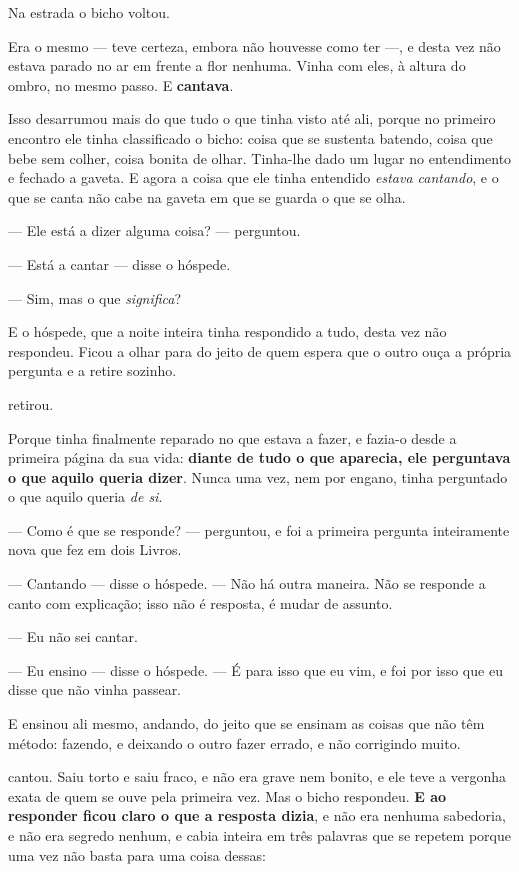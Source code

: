 \documentclass[livro.tex]{subfiles}
\begin{document}
Na estrada o bicho voltou.

Era o mesmo --- \Ben teve certeza, embora não houvesse como ter ---, e desta
vez não estava parado no ar em frente a flor nenhuma. Vinha com eles, à altura
do ombro, no mesmo passo. E \textbf{cantava}.

\medskip
\noindent Isso desarrumou \Ben mais do que tudo o que tinha visto até ali,
porque no primeiro encontro ele tinha classificado o bicho: coisa que se
sustenta batendo, coisa que bebe sem colher, coisa bonita de olhar. Tinha-lhe
dado um lugar no entendimento e fechado a gaveta. E agora a coisa que ele
tinha entendido \emph{estava cantando}, e o que se canta não cabe na gaveta em
que se guarda o que se olha.

\medskip
\noindent --- Ele está a dizer alguma coisa? --- perguntou.

--- Está a cantar --- disse o hóspede.

--- Sim, mas o que \emph{significa}?

\medskip
\noindent E o hóspede, que a noite inteira tinha respondido a tudo, desta vez
não respondeu. Ficou a olhar para \Ben do jeito de quem espera que o outro
ouça a própria pergunta e a retire sozinho.

\medskip
\noindent \Ben retirou.

\medskip
\noindent Porque tinha finalmente reparado no que estava a fazer, e fazia-o
desde a primeira página da sua vida: \textbf{diante de tudo o que aparecia, ele
perguntava o que aquilo queria dizer}. Nunca uma vez, nem por engano, tinha
perguntado o que aquilo queria \emph{de si}.

\medskip
\noindent --- Como é que se responde? --- perguntou, e foi a primeira pergunta
inteiramente nova que fez em dois Livros.

--- Cantando --- disse o hóspede. --- Não há outra maneira. Não se responde a
canto com explicação; isso não é resposta, é mudar de assunto.

--- Eu não sei cantar.

--- Eu ensino --- disse o hóspede. --- É para isso que eu vim, e foi por isso
que eu disse que não vinha passear.

\medskip
\noindent E ensinou ali mesmo, andando, do jeito que se ensinam as coisas que
não têm método: fazendo, e deixando o outro fazer errado, e não corrigindo
muito.

\medskip
\noindent \Ben cantou. Saiu torto e saiu fraco, e não era grave nem bonito, e
ele teve a vergonha exata de quem se ouve pela primeira vez. Mas o bicho
respondeu. \textbf{E ao responder ficou claro o que a resposta dizia}, e não
era nenhuma sabedoria, e não era segredo nenhum, e cabia inteira em três
palavras que se repetem porque uma vez não basta para uma coisa dessas:
\end{document}
